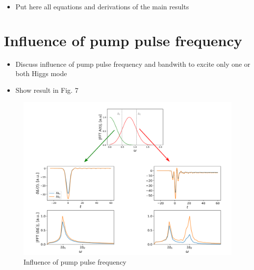 \documentclass[aps,prb,reprint,noeprint,superscriptaddress]{revtex4-2}
\begin{document}
\begin{itemize}
	\item Put here all equations and derivations of the main results
\end{itemize}






\section{Influence of pump pulse frequency}
\label{sec:influence_pump_pulse_freq}

\begin{itemize}
	\item Discuss influence of pump pulse frequency and bandwith to excite only one or both Higgs mode
	\item Show result in Fig. 7
\end{itemize}

\begin{figure}[H]
    \centering
    \includegraphics[width=\columnwidth]{figures/influence_pump_pulse_freq.png}
    \caption{\label{fig:influence_pump_pulse_freq}%
    Influence of pump pulse frequency}
\end{figure}%
\end{document}

